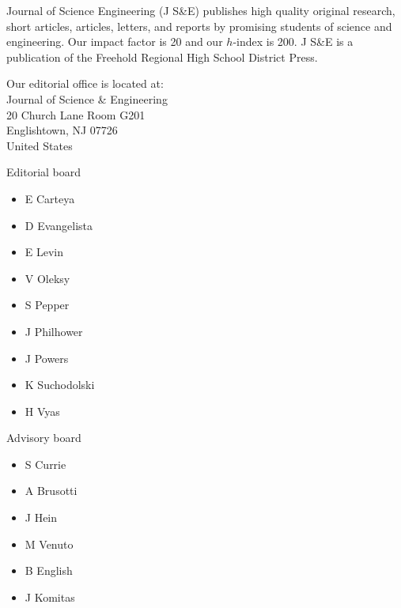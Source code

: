 \documentclass[letterpaper,11pt,twoside,electronic,headers=exceptpdf,papers=countpages,linkcolor=blue,urlcolor=blue]{confproc}
\author{\procpdfauthor}
\title{\procpdftitle}
\date{\today}
\begin{document}
\frontmatter
\setcounter{page}{1}
{}
\newpage
\noindent Journal of Science Engineering (J S\&E) publishes high quality original research, short articles, articles, letters, and reports by promising students of science and engineering.  Our impact factor is 20 and our $h$-index is 200.  J S\&E is a publication of the Freehold Regional High School District Press. 
\vspace{2ex}

\noindent Our editorial office is located at:\\

\noindent Journal of Science \& Engineering\\20 Church Lane Room G201\\Englishtown, NJ 07726\\United States
\vspace{2ex}

\noindent\small Editorial board
\begin{itemize}
\itemsep-0.5em
\item[] E Carteya
\item[] D Evangelista
\item[] E Levin
\item[] V Oleksy
\item[] S Pepper
\item[] J Philhower
\item[] J Powers
\item[] K Suchodolski
\item[] H Vyas
\end{itemize}

\noindent\small Advisory board
\begin{itemize}
\itemsep-0.5em
\item[] S Currie
\item[] A Brusotti
\item[] J Hein
\item[] M Venuto
\item[] B English
\item[] J Komitas
\end{itemize}

\vfill

\vspace{2ex}
\end{document}
